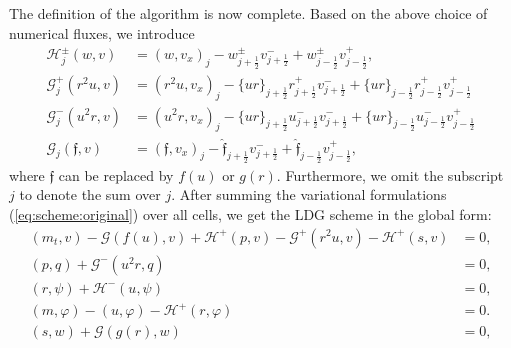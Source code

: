 \documentclass[11pt]{article}
\newcommand{\Hcal} {\mathcal{H}}
\newcommand{\Gcal} {\mathcal{G}}
\newcommand{\jbhalf}{j-\frac12}
\newcommand{\jfhalf}{j+\frac12}
\numberwithin{equation}{section}
\newcommand{\jl}{j-\frac 12}
\newcommand{\jr}{j+\frac 12}
\begin{document}
The definition of the algorithm is now complete. Based on the above choice of numerical fluxes, we introduce
	\begin{align}
	\Hcal_j^{\pm}(w,v)&=(w,v_x)_j - w_{\jfhalf}^{\pm}v_{\jfhalf}^{-} +  w_{\jbhalf}^{\pm}    v_{\jbhalf}^+,\\
	\Gcal_j^+(r^2u, v)&=(r^2u,v_x)_j - \{ur\}_{\jr}r^+_{\jr}v_{\jfhalf}^{-} + \{ur\}_{\jl}r^+_{\jl}  v_{\jbhalf}^+\\
	\Gcal_j^-(u^2r, v)&=(u^2r,v_x)_j - \{ur\}_{\jr}u^-_{\jr}v_{\jfhalf}^{-} + \{ur\}_{\jl}u^-_{\jl}  v_{\jbhalf}^+\\
	\Gcal_j(\mathfrak{f}, v)&=(\mathfrak{f},v_x)_j - \hat{\mathfrak{f}}_{\jr}v_{\jfhalf}^{-} + \hat{\mathfrak{f}}_{\jl}  v_{\jbhalf}^+,
\end{align}
where $\mathfrak{f}$ can be replaced by $f(u)$ or $g(r)$. Furthermore, we omit the subscript $j$ to denote the sum over $j$. After summing the variational formulations (\ref{eq:scheme:original}) over all cells, we get the LDG scheme in the global form:
\vspace{-0.3cm}
\begin{subequations}\label{LDG:global}
\begin{align}
(m_{t}, v)-\Gcal(f(u), v)+\Hcal^+(p,v)-\Gcal^+(r^2u,v)-\Hcal^+(s,v)&=0,\label{LDG:11:local}\\
(p, q)+\Gcal^-(u^2r,q)&=0,\label{LDG:12:local}	\\
(r,\psi)+\Hcal^-(u,\psi)&=0,\label{LDG:13:local}	\\
(m,\varphi)-(u, \varphi)-\Hcal^+(r,\varphi)&=0.\label{LDG:14:local} \\
(s, w)+\Gcal(g(r),w)&=0,\label{LDG:15:local}		
\end{align}
\end{subequations}
\end{document}
